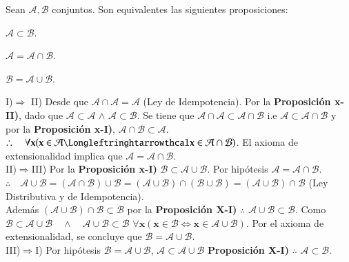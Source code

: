 \begin{proposition}
Sean $\mathcal{A,B}$ conjuntos. Son equivalentes las siguientes proposiciones:
	\begin{iteritem}
	\item $\mathcal{A}\subset\mathcal{B}$.
	\item $\mathcal{A}=\mathcal{A}\cap\mathcal{B}$.
	\item $\mathcal{B}=\mathcal{A}\cup\mathcal{B}$.
	\end{iteritem}
\end{proposition}
\begin{proof2}
I)$\Longrightarrow$ II) Desde que $\mathcal{A}\cap\mathcal{A}=\mathcal{A}$ (Ley de Idempotencia). Por la \textbf{Proposición x-II)}, dado que $\mathcal{A}\subset\mathcal{A}$ $\wedge$ $\mathcal{A}\subset\mathcal{B}$. Se tiene que $\mathcal{A}\cap\mathcal{A}\subset\mathcal{A}\cap\mathcal{B}$ i.e $\mathcal{A}\subset\mathcal{A}\cap\mathcal{B}$ y por la \textbf{Proposición x-I)}, $\mathcal{A}\cap\mathcal{B}\subset\mathcal{A}$. $\therefore \quad \forall\mathbf{x}(\mathbf{x}\in\mathcal{A}\Longleftringhtarrowthcal\mathbf{x}\in\mathcal{A}\cap\mathcal{B})$. El axioma de extensionalidad implica que $\mathcal{A}=\mathcal{A}\cap\mathcal{B}$.\\

II)$\Longrightarrow$III) Por la \textbf{Proposición x-I)} $\mathcal{B}\subset\mathcal{A}\cup\mathcal{B}$. Por hipótesis $\mathcal{A}=\mathcal{A}\cap\mathcal{B}$.\\
	$\therefore\quad\mathcal{A}\cup\mathcal{B}=(\mathcal{A}\cap\mathcal{B})\cup\mathcal{B}=(\mathcal{A}\cup\mathcal{B})\cap(\mathcal{B}\cup\mathcal{B})=(\mathcal{A}\cup\mathcal{B})\cap\mathcal{B}$ (Ley Distributiva y de Idempotencia).\\

Además $(\mathcal{A}\cup\mathcal{B})\cap\mathcal{B}\subset\mathcal{B}$ por la \textbf{Proposición X-I)} $\therefore$ $\mathcal{A}\cup\mathcal{B}\subset\mathcal{B}$. Como $\mathcal{B}\subset\mathcal{A}\cup\mathcal{B}\quad\wedge\quad\mathcal{A}\cup\mathcal{B}\subset\mathcal{B}$ $\forall\mathbf{x}(\mathbf{x}\in\mathcal{B} \Longleftrightarrow \mathbf{x}\in\mathcal{A}\cup\mathcal{B})$. Por el axioma de extensionalidad, se concluye que $\mathcal{B}=\mathcal{A}\cup\mathcal{B}$.\\

	III)$\Longrightarrow$I) Por hipótesis $\mathcal{B}=\mathcal{A}\cup\mathcal{B}$, $\mathcal{A}\subset\mathcal{A}\cup\mathcal{B}$ \textbf{Proposición X-I)} $\therefore$ $\mathcal{A}\subset\mathcal{B}$.\\
\end{proof2}
\pagebreak 

